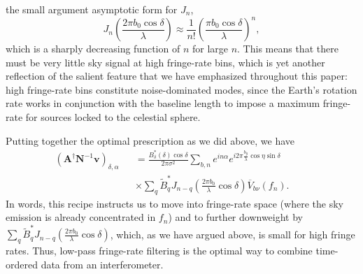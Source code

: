 \documentclass[twocolumn,apj,numberedappendix]{emulateapj}
\newcommand{\vis}{\mathbf{v}}
\newcommand{\A}{\mathbf{A}}
\newcommand{\N}{\mathbf{N}}
\begin{document}
the small argument asymptotic form for $J_n$,\begin{equation}
J_n \left( \frac{2 \pi b_0 \cos \delta}{ \lambda} \right) \approx \frac{1}{n!} \left( \frac{ \pi b_0 \cos \delta}{ \lambda} \right)^n,
\end{equation}
which is a sharply decreasing function of $n$ for large $n$.  This means that
there must be very little sky signal at high fringe-rate bins, which is yet another
reflection of the salient feature that we have emphasized throughout this paper:
high fringe-rate bins constitute noise-dominated modes, since the Earth's rotation
rate works in conjunction with the baseline length to impose a maximum fringe-rate
for sources locked to the celestial sphere.

Putting together the optimal prescription as we did above, we have
%
\begin{eqnarray}
\label{eq:AdagNinvv}
\left( \A^\dagger \N^{-1} \vis \right)_{\delta,\alpha} && = \frac{B_\delta^* (\delta)  \cos \delta}{2\pi \sigma^2} \sum_{b,n} e^{i n \alpha} e^{i 2 \pi  \frac{b_y}{\lambda} \cos \eta \sin \delta} \nonumber \\
&& \times \sum_{q} \widetilde{B}_q^* J_{n-q} \left( \frac{2 \pi b_0}{\lambda} \cos \delta \right) \overline{V}_{b\nu} (f_n). \qquad
\end{eqnarray}
In words, this recipe instructs us to move into fringe-rate space (where the
sky emission is already concentrated in $f_n$) and to further downweight by
$\sum_{q} \widetilde{B}_q^* J_{n-q} \left( \frac{2 \pi b_0}{\lambda} \cos \delta \right)$, which, as we have argued above, is small for high fringe
rates.  Thus, low-pass fringe-rate filtering is the optimal way to combine
time-ordered data from an interferometer.
\end{document}
